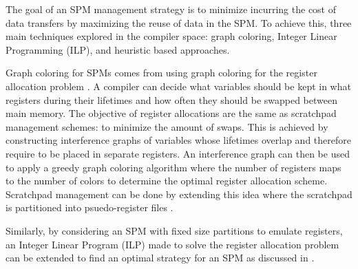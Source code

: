 The goal of an SPM management strategy is to minimize incurring the cost of
data transfers by maximizing the reuse of data in the SPM. To achieve this,
three main techniques explored in the compiler space: graph coloring, Integer
Linear Programming (ILP), and heuristic based approaches.

Graph coloring for SPMs comes from using graph coloring for the register
allocation problem \cite{registerAllocation} \cite{graphColoring}. A compiler
can decide what variables should be kept in what registers during their
lifetimes and how often they should be swapped between main memory.  The
objective of register allocations are the same as scratchpad management
schemes: to minimize the amount of swaps. This is achieved by constructing
interference graphs of variables whose lifetimes overlap and therefore require
to be placed in separate registers. An interference graph can then be used to
apply a greedy graph coloring algorithm where the number of registers maps to
the number of colors to determine the optimal register allocation scheme.
Scratchpad management can be done by extending this idea where the scratchpad
is partitioned into psuedo-register files \cite{graphColoring}. 

Similarly, by considering an SPM with fixed size partitions to emulate registers,
an Integer Linear Program (ILP) made to solve the register allocation problem can
be extended to find an optimal strategy for an SPM as discussed in \cite{verma}.











